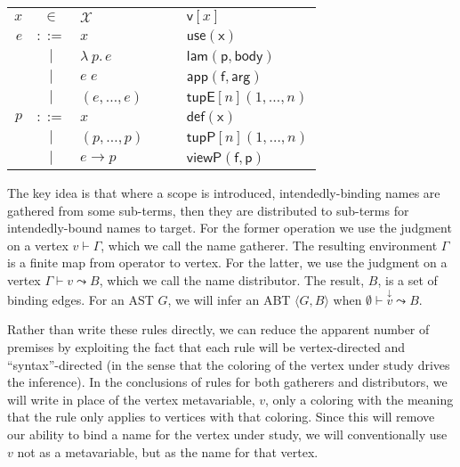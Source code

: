 \documentclass[11pt]{article} %
\theoremstyle{definition}
\newcommand{\fn}{\lambda\:\!}
\begin{document}
\begin{tabular}{rclcl}
$x$ & $\in$ & $\mathcal{X}$ &$\quad$& $\mathsf{v}[x]$ \\
$e$ & $::=$ & $x$ && $\mathsf{use}(\mathsf{x})$ \\
& $\mid$ & $\fn p.\,e$ && $\mathsf{lam}(\mathsf{p, body})$ \\
& $\mid$ & $e\;e$ && $\mathsf{app}(\mathsf{f, arg})$ \\
& $\mid$ & $(e, \ldots, e)$ && $\mathsf{tupE}[n](1, \ldots, n)$ \\
$p$ & $::=$ & $x$ && $\mathsf{def}(\mathsf{x})$ \\
& $\mid$ & $(p, \ldots, p)$ && $\mathsf{tupP}[n](1, \ldots, n)$ \\
& $\mid$ & $e \to p$ && $\mathsf{viewP}(\mathsf{f, p})$ \\
\end{tabular}

The key idea is that where a scope is introduced, intendedly-binding names are gathered from some sub-terms, then they are distributed to sub-terms for intendedly-bound names to target.
For the former operation we use the judgment on a vertex $v \vdash \Gamma$, which we call the name gatherer.
The resulting environment $\Gamma$ is a finite map from operator to vertex.
For the latter, we use the judgment on a vertex $\Gamma \vdash v \leadsto B$, which we call the name distributor.
The result, $B$, is a set of binding edges.
For an AST $G$, we will infer an ABT $\langle G, B \rangle$ when $\emptyset \vdash \overset{\downarrow}v \leadsto B$.

Rather than write these rules directly, we can reduce the apparent number of premises by exploiting the fact that each rule will be vertex-directed and ``syntax''-directed (in the sense that the coloring of the vertex under study drives the inference).
In the conclusions of rules for both gatherers and distributors, we will write in place of the vertex metavariable, $v$, only a coloring with the meaning that the rule only applies to vertices with that coloring.
Since this will remove our ability to bind a name for the vertex under study, we will conventionally use $v$ not as a metavariable, but as the name for that vertex.
\end{document}
